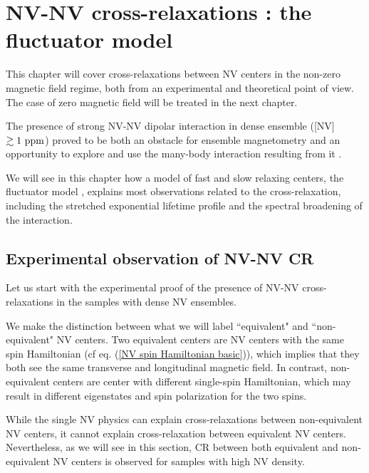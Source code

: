 \documentclass[a4paper, 11pt]{report}
\begin{document}
\chapter{NV-NV cross-relaxations : the fluctuator model}
This chapter will cover cross-relaxations between NV centers in the non-zero magnetic field regime, both from an experimental and theoretical point of view. The case of zero magnetic field will be treated in the next chapter.

The presence of strong NV-NV dipolar interaction in dense ensemble ([NV] $\gtrsim 1\ \rm ppm$) proved to be both an obstacle for ensemble magnetometry \citep{zhou2020quantum} and an opportunity to explore and use the many-body interaction resulting from it \citep{zhou2020quantum, choi2017observation, kucsko2018critical, zu2021emergent}.

We will see in this chapter how a model of fast and slow relaxing centers, the fluctuator model \citep{choi2017depolarization}, explains most observations related to the cross-relaxation, including the stretched exponential lifetime profile and the spectral broadening of the interaction.

\section{Experimental observation of NV-NV CR}
Let us start with the experimental proof of the presence of NV-NV cross-relaxations in the samples with dense NV ensembles.

We make the distinction between what we will label ``equivalent" and ``non-equivalent" NV centers. Two equivalent centers are NV centers with the same spin Hamiltonian (cf eq. (\ref{NV spin Hamiltonian basic})), which implies that they both see the same transverse and longitudinal magnetic field. In contrast, non-equivalent centers are center with different single-spin Hamiltonian, which may result in different eigenstates and spin polarization for the two spins.

While the single NV physics can explain cross-relaxations between non-equivalent NV centers, it cannot explain cross-relaxation between equivalent NV centers. Nevertheless, as we will see in this section, CR between both equivalent and non-equivalent NV centers is observed for samples with high NV density. 
\end{document}
